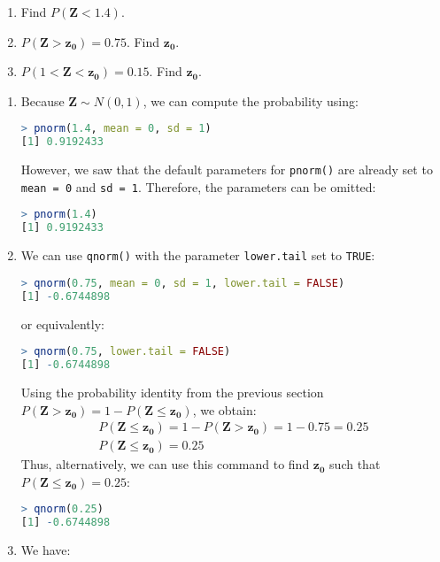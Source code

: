 \begin{exmp}
    \begin{enumerate}
        \item Find \( P(\bm{Z} < 1.4) \).
        \item \( P(\bm{Z} > \bm{z_0}) = 0.75 \). Find \( \bm{z_0} \).
        \item \( P(1 < \bm{Z} < \bm{z_0}) = 0.15 \). Find \( \bm{z_0} \).
    \end{enumerate}
\end{exmp}
\begin{solution}
    \begin{enumerate}
        \item Because \( \bm{Z} \sim N(0, 1) \), we can compute the probability using:
    \begin{lstlisting}[language=R]
> pnorm(1.4, mean = 0, sd = 1)
[1] 0.9192433      
    \end{lstlisting}
    However, we saw that the default parameters for \verb|pnorm()| are already set to \verb|mean = 0| and \verb|sd = 1|.
    Therefore, the parameters can be omitted:
    \begin{lstlisting}[language=R]
> pnorm(1.4)
[1] 0.9192433      
    \end{lstlisting}
    \item We can use \verb|qnorm()| with the parameter \verb|lower.tail| set to \verb|TRUE|:
    \begin{lstlisting}[language=R]
> qnorm(0.75, mean = 0, sd = 1, lower.tail = FALSE)
[1] -0.6744898
    \end{lstlisting}
    or equivalently:
    \begin{lstlisting}[language=R]
> qnorm(0.75, lower.tail = FALSE)
[1] -0.6744898
    \end{lstlisting}
    Using the probability identity from the previous section \( P(\bm{Z} > \bm{z_0}) = 1 - P(\bm{Z} \leq \bm{z_0}) \), we obtain:
    \begin{gather*}
        P(\bm{Z} \leq \bm{z_0}) = 1 - P(\bm{Z} > \bm{z_0}) = 1 - 0.75 = 0.25\\
        P(\bm{Z} \leq \bm{z_0}) = 0.25
    \end{gather*}
    Thus, alternatively, we can use this command to find \( \bm{z_0} \) such that \( P(\bm{Z} \leq \bm{z_0}) = 0.25 \):
    \begin{lstlisting}[language=R]
> qnorm(0.25)
[1] -0.6744898
    \end{lstlisting}
    \item We have:
    \begin{align*}

\end{align*}
\end{enumerate}
\end{solution}
